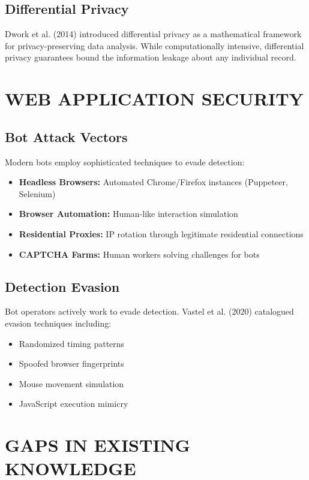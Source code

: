 \subsection{Differential Privacy}

Dwork et al. (2014) introduced differential privacy as a mathematical framework for privacy-preserving data analysis. While computationally intensive, differential privacy guarantees bound the information leakage about any individual record.

\section{WEB APPLICATION SECURITY}

\subsection{Bot Attack Vectors}

Modern bots employ sophisticated techniques to evade detection:
\begin{itemize}
    \item \textbf{Headless Browsers:} Automated Chrome/Firefox instances (Puppeteer, Selenium)
    \item \textbf{Browser Automation:} Human-like interaction simulation
    \item \textbf{Residential Proxies:} IP rotation through legitimate residential connections
    \item \textbf{CAPTCHA Farms:} Human workers solving challenges for bots
\end{itemize}

\subsection{Detection Evasion}

Bot operators actively work to evade detection. Vastel et al. (2020) catalogued evasion techniques including:
\begin{itemize}
    \item Randomized timing patterns
    \item Spoofed browser fingerprints
    \item Mouse movement simulation
    \item JavaScript execution mimicry
\end{itemize}

\section{GAPS IN EXISTING KNOWLEDGE}

